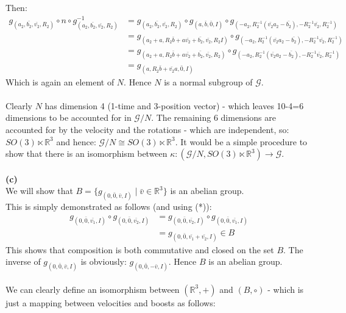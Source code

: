 \documentclass[12pt]{article}
\begin{document}
Then:
\begin{align*}
  g_{(a_2, \bar{b_2}, \bar{v_2}, R_2)} \circ n \circ g_{(a_2, \bar{b_2}, \bar{v_2}, R_2)}^{-1} &=  g_{(a_2, \bar{b_2}, \bar{v_2}, R_2)} \circ g_{(a, \bar{b}, \bar{0}, I)} \circ g_{(-a_2, R_2^{-1}(\bar{v_2} a_2 - \bar{b_2}), -R_2^{-1}\bar{v_2}, R_2^{-1})} \\
  &= g_{(a_2 + a, R_2\bar{b} + a \bar{v_2}+ \bar{b_2}, \bar{v_2}, R_2 I )} \circ g_{(-a_2, R_2^{-1}(\bar{v_2} a_2 - \bar{b_2}), -R_2^{-1}\bar{v_2}, R_2^{-1})} \\
  &= g_{(a_2 + a, R_2\bar{b} + a \bar{v_2}+ \bar{b_2}, \bar{v_2}, R_2 )} \circ g_{(-a_2, R_2^{-1}(\bar{v_2} a_2 - \bar{b_2}), -R_2^{-1}\bar{v_2}, R_2^{-1})} \\
  &= g_{(a,R_2\bar{b} + \bar{v_2} a,\bar{0},I)}
\end{align*}
Which is again an element of $N$.  Hence $N$ is a normal subgroup of $\mathcal{G}$.\\
\\
Clearly $N$ has dimension 4 (1-time and 3-position vector) - which leaves 10-4=6 dimensions to be accounted for in $\mathcal{G}/N$.  
The remaining 6 dimensions are accounted for by the velocity and the rotations - which are independent, so:  $SO(3) \ltimes \mathbb{R}^3$
and hence: $\mathcal{G}/N \cong SO(3) \ltimes \mathbb{R}^3$.  It would be a simple procedure to show that there is an isomorphism between
$\kappa : (\mathcal{G}/N, SO(3) \ltimes \mathbb{R}^3) \to \mathcal{G}$.\\
\\
\textbf{(c)}\\
We will show that $B = \{g_{(0, \bar{0}, \bar{v}, I)} \; | \; \bar{v} \in  \mathbb{R}^3\}$ is an abelian group.\\
This is simply demonstrated as follows (and using (*)):
\begin{align*}
  g_{(0, \bar{0}, \bar{v_1}, I)} \circ g_{(0, \bar{0}, \bar{v_2}, I)} &= g_{(0, \bar{0}, \bar{v_2}, I)} \circ g_{(0, \bar{0}, \bar{v_1}, I)}\tag{**} \\
  &= g_{(0, \bar{0}, \bar{v_1} + \bar{v_2}, I)} \in B 
\end{align*}
This shows that composition is both commutative and closed on the set $B$.  The inverse of $g_{(0, \bar{0}, \bar{v}, I)}$ is obviously: $g_{(0, \bar{0}, -\bar{v}, I)}$.
Hence $B$ is an abelian group.\\
\\
We can clearly define an isomorphism between $(\mathbb{R}^3, +)$ and $(B, \circ)$ - which is just a mapping between velocities and boosts as follows:
\end{document}
